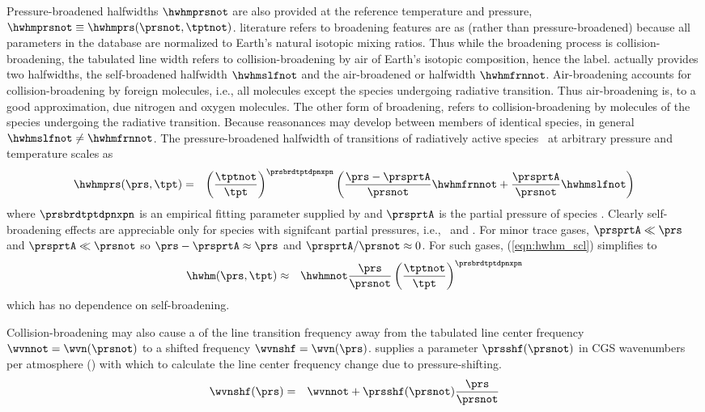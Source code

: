 \documentclass[12pt]{article}
\begin{document}
Pressure-broadened halfwidths $\hwhmprsnot$ are also provided at the 
reference temperature and pressure, 
$\hwhmprsnot \equiv \hwhmprs(\prsnot,\tptnot)$.
 literature refers to broadening features are as
 (rather than pressure-broadened) because all
parameters in the  database are normalized to Earth's natural
isotopic mixing ratios. 
Thus while the broadening process is collision-broadening, the
tabulated line width refers to collision-broadening by air of Earth's  
isotopic composition, hence the label. 
 actually provides two halfwidths, the self-broadened halfwidth
$\hwhmslfnot$ and the air-broadened or 
halfwidth $\hwhmfrnnot$.
Air-broadening accounts for collision-broadening by foreign molecules,
i.e., all molecules except the species undergoing radiative
transition. 
Thus air-broadening is, to a good approximation, due nitrogen and
oxygen molecules.
The other form of broadening,  refers to
collision-broadening by molecules of the species undergoing the
radiative transition. 
Because reasonances may develop between members of identical species,
in general $\hwhmslfnot \ne \hwhmfrnnot$.
The pressure-broadened halfwidth of transitions of radiatively active
species \AAA\ at arbitrary pressure and temperature scales as 
\begin{eqnarray}
\hwhmprs(\prs,\tpt) & = & 
\left( \frac{\tptnot}{\tpt} \right)^{\prsbrdtptdpnxpn} 
\left( \frac{\prs - \prsprtA}{\prsnot} \hwhmfrnnot +
\frac{\prsprtA}{\prsnot} \hwhmslfnot \right)
\label{eqn:hwhm_scl}
\end{eqnarray}
where $\prsbrdtptdpnxpn$ is an empirical fitting parameter supplied by
 and $\prsprtA$ is the partial pressure of species \AAA.
Clearly self-broadening effects are appreciable only for species with 
signifcant partial pressures, i.e., \Od\ and \Nd. 
For minor trace gases, $\prsprtA \ll \prs$ and $\prsprtA \ll \prsnot$
so $\prs - \prsprtA \approx \prs$ and $\prsprtA/\prsnot \approx 0$.
For such gases, (\ref{eqn:hwhm_scl}) simplifies to
\begin{eqnarray}
\hwhm(\prs,\tpt) & \approx & 
\hwhmnot \frac{\prs}{\prsnot}
\left( \frac{\tptnot}{\tpt} \right)^{\prsbrdtptdpnxpn} 
\label{eqn:hwhm_apx_scl}
\end{eqnarray}
which has no dependence on self-broadening.

Collision-broadening may also cause a  of the
line transition frequency away from the tabulated line center
frequency $\wvnnot = \wvn(\prsnot)$ to a shifted frequency 
$\wvnshf = \wvn(\prs)$.
 supplies a parameter $\prsshf(\prsnot)$ in CGS
wavenumbers per atmosphere (\wvnxatm) with which to calculate the line
center frequency change due to pressure-shifting.
\begin{eqnarray}
\wvnshf(\prs) & = & \wvnnot + \prsshf(\prsnot) \frac{\prs}{\prsnot}
\label{eqn:prs_shf_dfn}
\end{eqnarray}
\end{document}
